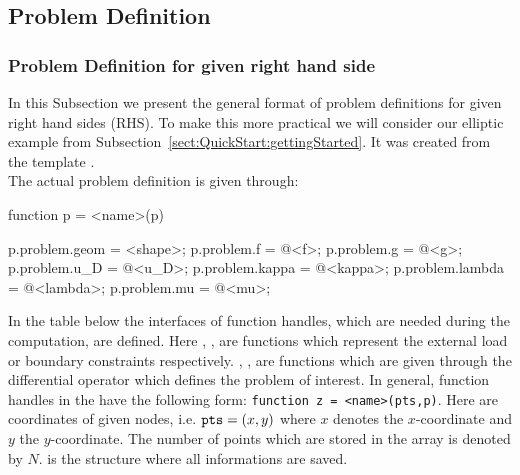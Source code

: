 \subsection{Problem Definition}
\label{sect:QuickStart:ProblemDefinition}

\subsubsection{Problem Definition for given right hand side}
\label{sect:QuickStart:ProblemDefinition:RHS}

In this Subsection we present the general format of problem definitions for given right hand sides (RHS). To make this more practical we will consider our elliptic example from Subsection~\ref{sect:QuickStart:gettingStarted}. It was created from the template .\medskip\\
The actual problem definition is given through:

\begin{pcode}
function p = <name>(p)

p.problem.geom = <shape>;
p.problem.f = @<f>;
p.problem.g = @<g>;
p.problem.u_D = @<u_D>;
p.problem.kappa = @<kappa>;
p.problem.lambda = @<lambda>;
p.problem.mu = @<mu>;
\end{pcode}

\noindent In the table below the interfaces of function handles, which are needed during the computation, are defined. Here , ,  are functions which represent the external load or boundary constraints respectively. , ,  are functions which are given through the differential operator which defines the problem of interest. In general, function handles in the \FFW have the following form: \verb"function z = <name>(pts,p)". Here  are coordinates of given nodes, i.e. $\texttt{pts}=(x,y)$ where $x$ denotes the $x$-coordinate and $y$ the $y$-coordinate. The number of points which are stored in the array  is denoted by $N$.  is the structure where all informations are saved.\medskip

